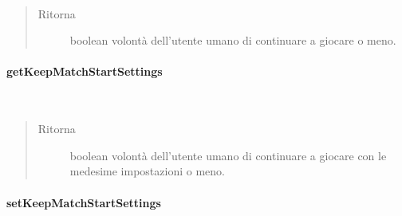 \documentclass[letterpaper,10pt,italian,openany,oneside]{sphinxmanual}
\begin{document}
\begin{fulllineitems}
\label{\detokenize{test/it/unicam/cs/pa/mastermind/gamecore/StartupSettings:it.unicam.cs.pa.mastermind.gamecore.StartupSettings.getContinue()}}~\begin{quote}\begin{description}
\item[{Ritorna}] \leavevmode
boolean volontà dell’utente umano di continuare a giocare o meno.

\end{description}\end{quote}

\end{fulllineitems}



\paragraph{getKeepMatchStartSettings}
\label{\detokenize{test/it/unicam/cs/pa/mastermind/gamecore/StartupSettings:getkeepmatchstartsettings}}

\begin{fulllineitems}
\label{\detokenize{test/it/unicam/cs/pa/mastermind/gamecore/StartupSettings:it.unicam.cs.pa.mastermind.gamecore.StartupSettings.getKeepMatchStartSettings()}}~\begin{quote}\begin{description}
\item[{Ritorna}] \leavevmode
boolean volontà dell’utente umano di continuare a giocare con le medesime impostazioni o meno.

\end{description}\end{quote}

\end{fulllineitems}



\paragraph{setKeepMatchStartSettings}
\label{\detokenize{test/it/unicam/cs/pa/mastermind/gamecore/StartupSettings:setkeepmatchstartsettings}}
\end{document}
